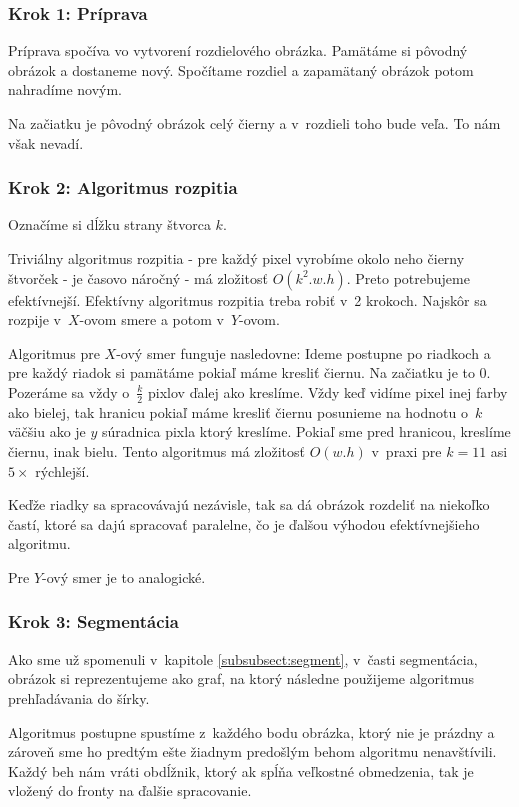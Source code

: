 \subsubsection{Krok 1: Príprava}
Príprava spočíva vo vytvorení rozdielového obrázka. Pamätáme si pôvodný obrázok a dostaneme nový. Spočítame rozdiel a zapamätaný obrázok potom nahradíme novým.

Na začiatku je pôvodný obrázok celý čierny a v~rozdieli toho bude veľa. To nám však nevadí. \todo

\subsubsection{Krok 2: Algoritmus rozpitia}
Označíme si dĺžku strany štvorca $k$.

Triviálny algoritmus rozpitia - pre každý pixel vyrobíme okolo neho čierny štvorček - je časovo náročný - má zložitosť $O(k^2.w.h)$. Preto potrebujeme efektívnejší. 
Efektívny algoritmus rozpitia treba robiť v~2 krokoch. Najskôr sa rozpije v~$X$-ovom smere a potom v~$Y$-ovom.

Algoritmus pre $X$-ový smer funguje nasledovne: Ideme postupne po riadkoch a pre každý riadok si pamätáme pokiaľ máme kresliť čiernu.
Na začiatku je to 0. Pozeráme sa vždy o~$\frac{k}{2}$ pixlov ďalej ako kreslíme.
Vždy keď vidíme pixel inej farby ako bielej, tak hranicu pokiaľ máme kresliť čiernu posunieme na hodnotu o~$k$ väčšiu ako je $y$ súradnica pixla ktorý kreslíme. Pokiaľ sme pred hranicou, kreslíme čiernu, inak bielu. Tento algoritmus má zložitosť $O(w.h)$ v~praxi pre $k=11$ asi $5\times$ rýchlejší.  

Keďže riadky sa spracovávajú nezávisle, tak sa dá obrázok rozdeliť na niekoľko častí, ktoré sa dajú spracovať paralelne, čo je ďalšou výhodou efektívnejšieho algoritmu.

Pre $Y$-ový smer je to analogické. 

\subsubsection{Krok 3: Segmentácia}
Ako sme už spomenuli v~kapitole \ref{subsubsect:segment}, v~časti segmentácia, obrázok si reprezentujeme ako graf, na ktorý následne použijeme algoritmus prehľadávania do šírky.

Algoritmus postupne spustíme z~každého bodu obrázka, ktorý nie je prázdny a zároveň sme ho predtým ešte žiadnym predošlým behom algoritmu nenavštívili. Každý beh nám vráti obdĺžnik, ktorý ak spĺňa veľkostné obmedzenia, tak je vložený do fronty na ďalšie spracovanie. 

